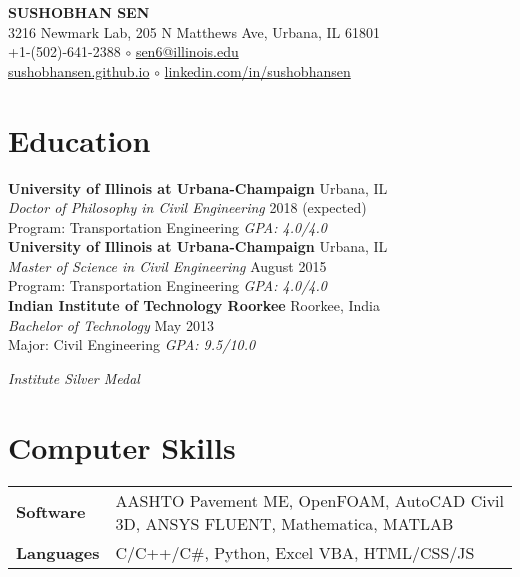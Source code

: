 \documentclass[12pt]{article}
\begin{document}
 \sloppy %
\begin{center}
{\large \uppercase{\textbf{Sushobhan Sen}}} \\
3216 Newmark Lab, 205 N Matthews Ave, Urbana, IL 61801 \\
+1-(502)-641-2388 $\circ$ \href{mailto:sen6@illinois.edu}{sen6@illinois.edu} \\
\href{http://sushobhansen.github.io/}{sushobhansen.github.io} $\circ$ \href{http://linkedin.com/in/sushobhansen}{linkedin.com/in/sushobhansen}
\end{center} 

\hfill \break %
\section*{Education}
\textbf{University of Illinois at Urbana-Champaign} \hfill Urbana, IL\\
\textit{Doctor of Philosophy in Civil Engineering} \hfill 2018 (expected)\\
Program: Transportation Engineering \hfill \textit{GPA: 4.0/4.0} \\

\textbf{University of Illinois at Urbana-Champaign} \hfill Urbana, IL\\
\textit{Master of Science in Civil Engineering} \hfill August 2015\\
Program: Transportation Engineering \hfill \textit{GPA: 4.0/4.0} \\

\textbf{Indian Institute of Technology Roorkee} \hfill Roorkee, India\\
\textit{Bachelor of Technology} \hfill May 2013\\
Major: Civil Engineering \hfill \textit{GPA: 9.5/10.0} \\
\strut \hfill \textit{Institute Silver Medal} \\ %

\section*{Computer Skills}
\begin{tabular}{p{10em} p{25em}} %
\textbf{Software} & AASHTO Pavement ME, OpenFOAM, AutoCAD Civil 3D, ANSYS FLUENT, Mathematica, MATLAB \\
\textbf{Languages} & C/C++/C\#, Python, Excel VBA, HTML/CSS/JS
\end{tabular}
\end{document}
